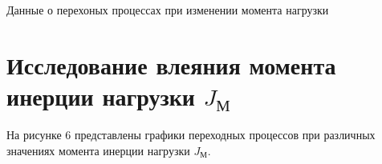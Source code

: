 \documentclass[a4paper, 12pt]{article}
\begin{document}
\begin{table}[h!]
    \centering
    \begin{threeparttable}
        \caption{Данные о перехоных процессах при изменении момента нагрузки}
    \end{threeparttable}
\end{table}

\newpage
\section{Исследование влеяния момента инерции нагрузки $J_\text{М}$}
На рисунке 6 представлены графики переходных процессов при различных значениях момента инерции нагрузки $J_\text{М}$.
\end{document}
